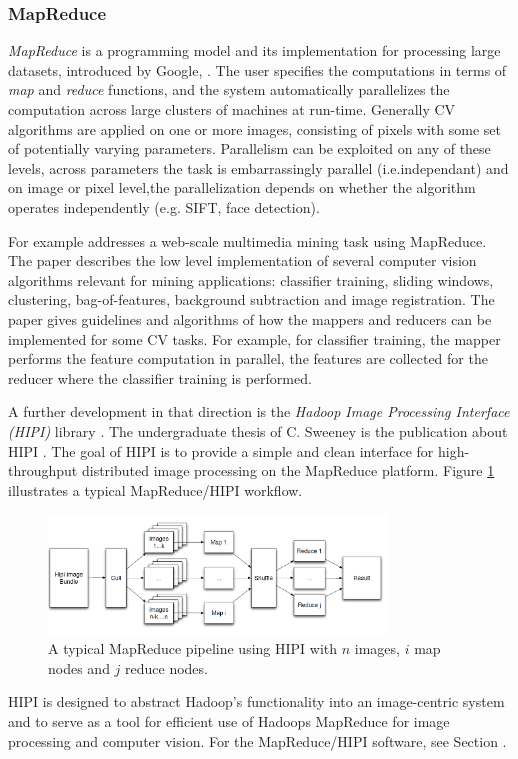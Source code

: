 \subsubsection{MapReduce}

{\em MapReduce} is a programming model and its implementation for processing large datasets, introduced by Google, \cite{Dean:2008}. The user specifies the computations in terms of {\em map} and {\em reduce} functions, and the system automatically parallelizes the computation across large clusters of machines at run-time. Generally CV algorithms are applied on one or more images, consisting of pixels with some set of potentially varying parameters. Parallelism can be exploited on any of these levels, across parameters the task is embarrassingly parallel (i.e.independant) and on image or pixel level,the parallelization depends on whether the algorithm operates independently (e.g. SIFT, face detection).

For example \cite{White:2010} addresses a web-scale multimedia mining task using MapReduce. The paper describes the low level implementation of several computer vision algorithms relevant for mining applications: classifier training, sliding windows, clustering, bag-of-features, background subtraction and image registration.  The paper gives guidelines and algorithms of how the mappers and reducers can be implemented for some CV tasks. For example, for classifier training, the mapper performs the feature computation in parallel, the features are collected for the reducer where the classifier training is performed. 

A further development in that direction is the {\em Hadoop Image Processing Interface (HIPI)} library \cite{hipi_soft}. The undergraduate thesis of C. Sweeney is the publication about HIPI \cite{hipi_pub}. The goal of HIPI is to provide a simple and clean interface for high-throughput distributed image processing on the MapReduce platform. Figure \ref{fig:hipi} illustrates a typical MapReduce/HIPI workflow.

\begin{figure}[H]
\begin{center}
\includegraphics[width=0.8\textwidth]{fig/HIPI}
\end{center}
\caption{A typical MapReduce pipeline using HIPI with $n$ images, $i$ map nodes and $j$ reduce nodes.}
\label{fig:hipi}
\end{figure}
HIPI is designed to abstract Hadoop's functionality into an image-centric system and to serve as a tool for efficient use of Hadoops MapReduce for image processing and computer vision.
For the MapReduce/HIPI software, see Section .

